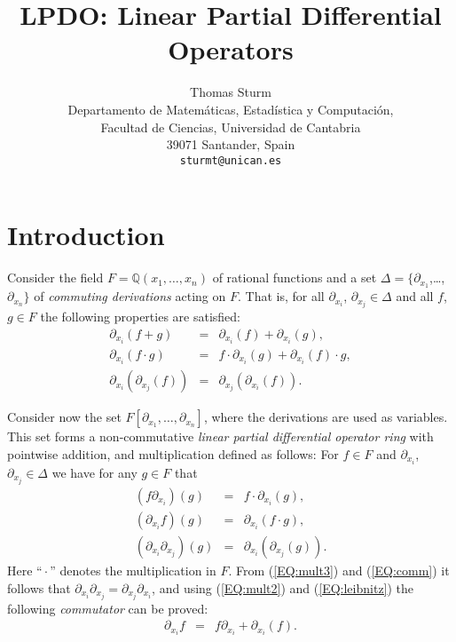 \documentclass[a4paper]{article}
\newcommand{\Q}{\mathbb{Q}}
\begin{document}
\title{LPDO: Linear Partial Differential Operators}
\author{Thomas Sturm\\
  Departamento de Matem\'aticas,
  Estad\'istica y Computaci\'on,\\
  Facultad de Ciencias,
  Universidad de Cantabria\\
  39071 Santander, Spain\\
  \texttt{sturmt@unican.es}}
\maketitle

\begin{abstract}

\end{abstract}

\section{Introduction}
Consider the field $F = \Q(x_1,\dots,x_n)$ of rational functions and a
set $\Delta = \{\partial_{x_1}$,\dots,~$\partial_{x_n}\}$ of
\emph{commuting derivations} acting on $F$. That is, for all
$\partial_{x_i}$, $\partial_{x_j} \in \Delta$ and all $f$, $g\in F$
the following properties are satisfied:
\begin{eqnarray}
\partial_{x_i}(f + g) &=& \partial_{x_i}(f) + \partial_{x_i}(g),\nonumber\\
\partial_{x_i}(f\cdot g) &=& f\cdot\partial_{x_i}(g)
  + \partial_{x_i}(f)\cdot g,\label{EQ:leibnitz}\\
\partial_{x_i}(\partial_{x_j}(f)) &=& \partial_{x_j}(\partial_{x_i}(f)).\label{EQ:comm}
\end{eqnarray}

Consider now the set $F[\partial_{x_1},\dots,\partial_{x_n}]$, where
the derivations are used as variables. This set forms a
non-commutative \emph{linear partial differential operator ring} with
pointwise addition, and multiplication defined as follows: For $f\in
F$ and $\partial_{x_i}$, $\partial_{x_j} \in \Delta$ we have for any
$g\in F$ that
\begin{eqnarray}
    (f \partial_{x_i})(g) &=& f \cdot \partial_{x_i}(g),\nonumber\\
    (\partial_{x_i} f)(g) &=& \partial_{x_i}(f \cdot g),\label{EQ:mult2}\\
    (\partial_{x_i} \partial_{x_j})(g) &=& \partial_{x_i}(\partial_{x_j}(g)).\label{EQ:mult3}
\end{eqnarray}
Here ``${}\cdot{}$'' denotes the multiplication in $F$. From
(\ref{EQ:mult3}) and (\ref{EQ:comm}) it follows that
$\partial_{x_i} \partial_{x_j}=\partial_{x_j} \partial_{x_i}$, and
using (\ref{EQ:mult2}) and (\ref{EQ:leibnitz}) the following
\emph{commutator} can be proved:
\begin{eqnarray*}
  \partial_{x_i} f &=& f \partial_{x_i} + \partial_{x_i}(f).
\end{eqnarray*}
\end{document}

